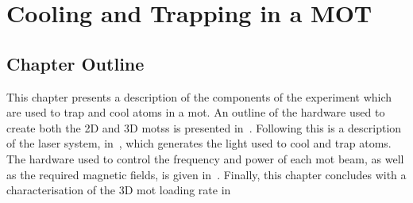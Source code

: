 \chapter{Cooling and Trapping in a MOT}
\section{Chapter Outline}
This chapter presents a description of the components of the experiment which
are used to trap and cool atoms in a \ac{mot}. An outline of the hardware used
to create both the 2D and 3D \acp{mots} is presented
in~. Following this is a description of the
\Muquans laser system, in~, which generates the
light used to cool and trap atoms. The hardware used to control the frequency
and power of each \ac{mot} beam, as well as the required magnetic fields, is
given in~. Finally, this chapter concludes with a
characterisation of the 3D \ac{mot} loading rate in~
